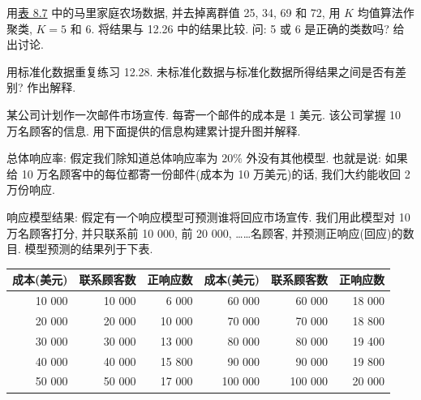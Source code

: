 \quad 用\hyperref[tab:8.7]{表 8.7} 中的马里家庭农场数据, 并去掉离群值 25, 34, 69 和 72, 用 $K$ 均值算法作聚类, $K=5$ 和 6. 将结果与 12.26 中的结果比较. 问: 5 或 6 是正确的类数吗? 给出讨论.

\quad 用标准化数据重复练习 12.28. 未标准化数据与标准化数据所得结果之间是否有差别? 作出解释.

\quad 某公司计划作一次邮件市场宣传. 每寄一个邮件的成本是 1 美元. 该公司掌握 10 万名顾客的信息. 用下面提供的信息构建累计提升图并解释.

总体响应率: 假定我们除知道总体响应率为 $20\%$ 外没有其他模型. 也就是说: 如果给 10 万名顾客中的每位都寄一份邮件(成本为 10 万美元)的话, 我们大约能收回 2 万份响应.

响应模型结果: 假定有一个响应模型可预测谁将回应市场宣传. 我们用此模型对 10 万名顾客打分, 并只联系前 10 000, 前 20 000, ……名顾客, 并预测正响应(回应)的数目. 模型预测的结果列于下表.

\begin{mvtable}
\begin{tabular}{rrr|rrr}
\toprule
成本(美元) & 联系顾客数 & 正响应数 & 成本(美元) & 联系顾客数 & 正响应数\\
\midrule
10 000 & 10 000 & 6 000 & 60 000 & 60 000 & 18 000\\
20 000 & 20 000 & 10 000 & 70 000 & 70 000 & 18 800\\
30 000 & 30 000 & 13 000 & 80 000 & 80 000 & 19 400\\
40 000 & 40 000 & 15 800 & 90 000 & 90 000 & 19 800\\
50 000 & 50 000 & 17 000 & 100 000 & 100 000 & 20 000\\
\bottomrule
\end{tabular}
\end{mvtable}
